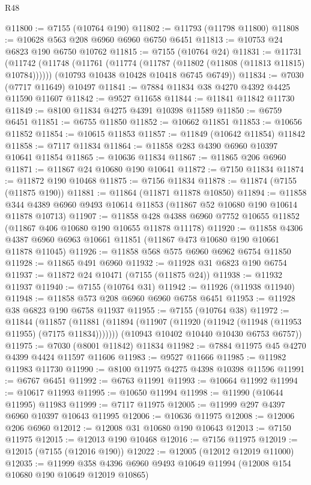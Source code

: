 \begin{lexlean}{R48}
\begin{coremodule}
@11800 := @7155 (@10764 @190)
@11802 := @11793 (@11798 @11800)
@11808 := @10628 @563 @208 @6960 @6960 @6750 @6451
@11813 := @10753 @24 @6823 @190 @6750 @10762
@11815 := @7155 (@10764 @24)
@11831 := @11731
    (@11742
      (@11748 (@11761 (@11774 (@11787 (@11802 (@11808 (@11813 @11815) @10784))))))
      (@10793 @10438 @10428 @10418 @6745 @6749))
@11834 := @7030 (@7717 @11649) @10497
@11841 := @7884 @11834 @38 @4270 @4392 @4425 @11590 @11607
@11842 := @9527 @11658
@11844 := @11841 @11842 @11730
@11849 := @8100 @11834 @4275 @4391 @10398 @11589
@11850 := @6759 @6451
@11851 := @6755 @11850
@11852 := @10662 @11851
@11853 := @10656 @11852
@11854 := @10615 @11853
@11857 := @11849 (@10642 @11854) @11842
@11858 := @7117 @11834
@11864 := @11858 @283 @4390 @6960 @10397 @10641 @11854
@11865 := @10636 @11834
@11867 := @11865 @206 @6960
@11871 := @11867 @24 @10680 @190 @10641
@11872 := @7150 @11834
@11874 := @11872 @190 @10468
@11875 := @7156 @11834
@11878 := @11874 (@7155 (@11875 @190))
@11881 := @11864 (@11871 @11878 @10850)
@11894 := @11858 @344 @4389 @6960 @9493 @10614 @11853 (@11867 @52 @10680 @190 @10614 @11878 @10713)
@11907 := @11858 @428 @4388 @6960 @7752 @10655 @11852 (@11867 @406 @10680 @190 @10655 @11878 @11178)
@11920 := @11858
    @4306
    @4387
    @6960
    @6963
    @10661
    @11851
    (@11867 @473 @10680 @190 @10661 @11878 @11045)
@11926 := @11858 @568 @575 @6960 @6962 @6754 @11850
@11928 := @11865 @491 @6960
@11932 := @11928 @31 @6823 @190 @6754
@11937 := @11872 @24 @10471 (@7155 (@11875 @24))
@11938 := @11932 @11937
@11940 := @7155 (@10764 @31)
@11942 := @11926 (@11938 @11940)
@11948 := @11858 @573 @208 @6960 @6960 @6758 @6451
@11953 := @11928 @38 @6823 @190 @6758 @11937
@11955 := @7155 (@10764 @38)
@11972 := @11844
    (@11857
      (@11881 (@11894 (@11907 (@11920 (@11942 (@11948 (@11953 @11955) (@7175 @11834)))))))
      (@10943 @10402 @10440 @10430 @6753 @6757))
@11975 := @7030 (@8001 @11842) @11834
@11982 := @7884 @11975 @45 @4270 @4399 @4424 @11597 @11606
@11983 := @9527 @11666
@11985 := @11982 @11983 @11730
@11990 := @8100 @11975 @4275 @4398 @10398 @11596
@11991 := @6767 @6451
@11992 := @6763 @11991
@11993 := @10664 @11992
@11994 := @10617 @11993
@11995 := @10650 @11994
@11998 := @11990 (@10644 @11995) @11983
@11999 := @7117 @11975
@12005 := @11999 @297 @4397 @6960 @10397 @10643 @11995
@12006 := @10636 @11975
@12008 := @12006 @206 @6960
@12012 := @12008 @31 @10680 @190 @10643
@12013 := @7150 @11975
@12015 := @12013 @190 @10468
@12016 := @7156 @11975
@12019 := @12015 (@7155 (@12016 @190))
@12022 := @12005 (@12012 @12019 @11000)
@12035 := @11999 @358 @4396 @6960 @9493 @10649 @11994 (@12008 @154 @10680 @190 @10649 @12019 @10865)

\end{coremodule}
\end{lexlean}
